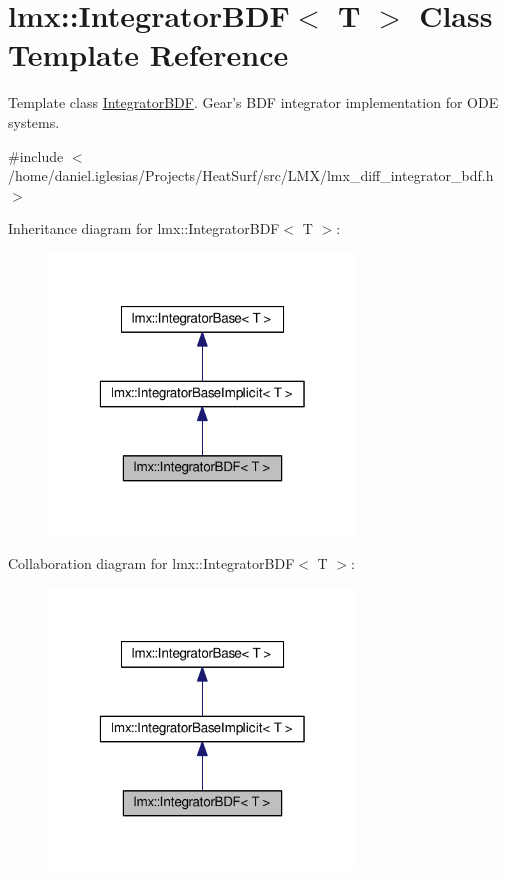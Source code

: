 \hypertarget{classlmx_1_1IntegratorBDF}{\section{lmx\-:\-:Integrator\-B\-D\-F$<$ T $>$ Class Template Reference}
\label{classlmx_1_1IntegratorBDF}
}


Template class \hyperlink{classlmx_1_1IntegratorBDF}{Integrator\-B\-D\-F}. Gear's B\-D\-F integrator implementation for O\-D\-E systems.  




{\ttfamily \#include $<$/home/daniel.\-iglesias/\-Projects/\-Heat\-Surf/src/\-L\-M\-X/lmx\-\_\-diff\-\_\-integrator\-\_\-bdf.\-h$>$}



Inheritance diagram for lmx\-:\-:Integrator\-B\-D\-F$<$ T $>$\-:
\nopagebreak
\begin{figure}[H]
\begin{center}
\leavevmode
\includegraphics[width=232pt]{classlmx_1_1IntegratorBDF__inherit__graph}
\end{center}
\end{figure}


Collaboration diagram for lmx\-:\-:Integrator\-B\-D\-F$<$ T $>$\-:
\nopagebreak
\begin{figure}[H]
\begin{center}
\leavevmode
\includegraphics[width=232pt]{classlmx_1_1IntegratorBDF__coll__graph}
\end{center}
\end{figure}
